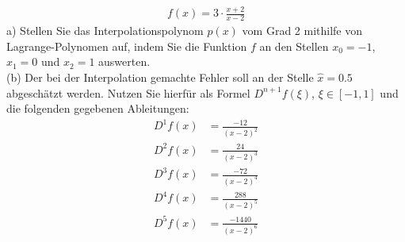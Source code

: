 \documentclass{scrartcl}
\begin{document}
	\begin{align*}
		f(x) = 3\cdot \frac{x + 2}{x - 2}
	\end{align*}
	a)
	Stellen Sie das Interpolationspolynom $p(x)$ vom Grad 2 mithilfe von Lagrange-Polynomen auf, indem Sie die Funktion $f$ an den Stellen $x_0 = -1$, $x_1 = 0$ und $x_2 = 1$ auswerten.
	\\
	(b)
	Der  bei der Interpolation gemachte Fehler soll an der Stelle $\hat{x} = 0.5$ abgeschätzt werden.
	\n 
	Nutzen Sie hierfür als Formel $D^{n+1} f(\xi)$, $\xi \in [-1, 1]$ und die folgenden gegebenen Ableitungen:
	\begin{align*}
		D^1f(x) &= \frac{-12}{(x-2)^2} \\
		D^2f(x) &= \frac{24}{(x-2)^3} \\
		D^3f(x) &= \frac{-72}{(x-2)^4} \\
		D^4f(x) &= \frac{288}{(x-2)^5} \\
		D^5f(x) &= \frac{-1440}{(x-2)^6} \\
	\end{align*}
\end{document}
